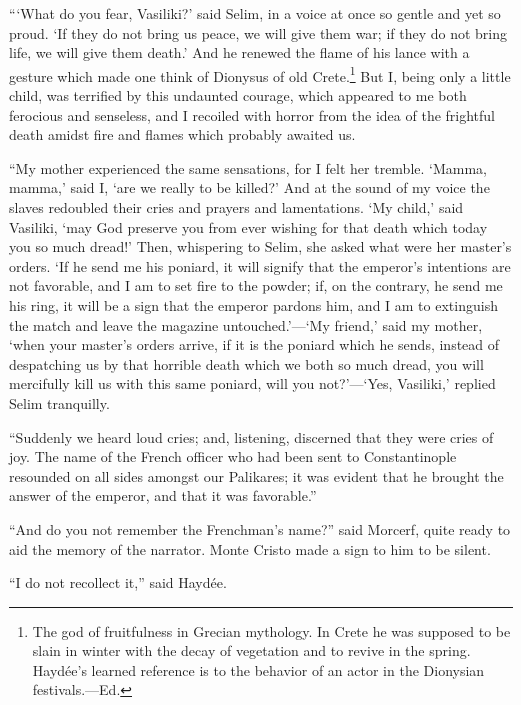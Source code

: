 “‘What do you fear, Vasiliki?’ said Selim, in a voice at once so gentle
and yet so proud. ‘If they do not bring us peace, we will give them
war; if they do not bring life, we will give them death.’ And he
renewed the flame of his lance with a gesture which made one think of
Dionysus of old Crete.\footnote[16]{The god of fruitfulness in Grecian
mythology. In Crete he was supposed to be slain in winter with the decay
of vegetation and to revive in the spring. Haydée’s learned reference is
to the behavior of an actor in the Dionysian festivals.—Ed.} But I,
being only a little child, was terrified by this undaunted courage, which
appeared to me both ferocious and senseless, and I recoiled with horror
from the idea of the frightful death amidst fire and flames which probably
awaited us.

“My mother experienced the same sensations, for I felt her tremble.
‘Mamma, mamma,’ said I, ‘are we really to be killed?’ And at the sound
of my voice the slaves redoubled their cries and prayers and
lamentations. ‘My child,’ said Vasiliki, ‘may God preserve you from
ever wishing for that death which today you so much dread!’ Then,
whispering to Selim, she asked what were her master’s orders. ‘If he
send me his poniard, it will signify that the emperor’s intentions are
not favorable, and I am to set fire to the powder; if, on the contrary,
he send me his ring, it will be a sign that the emperor pardons him,
and I am to extinguish the match and leave the magazine untouched.’—‘My
friend,’ said my mother, ‘when your master’s orders arrive, if it is
the poniard which he sends, instead of despatching us by that horrible
death which we both so much dread, you will mercifully kill us with
this same poniard, will you not?’—‘Yes, Vasiliki,’ replied Selim
tranquilly.

“Suddenly we heard loud cries; and, listening, discerned that they were
cries of joy. The name of the French officer who had been sent to
Constantinople resounded on all sides amongst our Palikares; it was
evident that he brought the answer of the emperor, and that it was
favorable.”

“And do you not remember the Frenchman’s name?” said Morcerf, quite
ready to aid the memory of the narrator. Monte Cristo made a sign to
him to be silent.

“I do not recollect it,” said Haydée.


